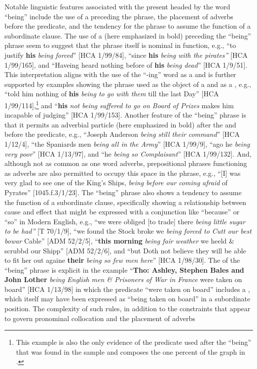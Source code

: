 Notable linguistic features associated with the present  headed by the word “being” include the use of a   preceding the phrase, the placement of adverbs before the predicate, and the tendency for the phrase to assume the function of a subordinate clause. The use of a   (here emphasized in bold) preceding the “being” phrase seem to suggest that the phrase itself is nominal in function, e.g., “to justify \textbf{his} \textit{being forced}” [HCA 1/99/84], “since \textbf{his} \textit{being with the pirates”} [HCA 1/99/165], and “Haveing heard nothing before of \textbf{his} \textit{being dead}” [HCA 1/9/51]. This interpretation aligns with the use of the “-ing” word as a  and is further supported by examples showing the phrase used as the object of a  and as a , e.g., “told him nothing of \textbf{his} \textit{being to go with them} till the last Day” [HCA 1/99/114],\footnote{This example is also the only evidence of the  predicate used after the  “being” that was found in the sample and composes the one percent of the graph in .}  and “\textbf{his} \textit{not being suffered to go on Board of Prizes} makes him incapable of judging” [HCA 1/99/153].  Another feature of the “being” phrase is that it permits an adverbial particle (here emphasized in bold) after the  and before the predicate, e.g., “Joseph Anderson \textit{being \textit{still} their} \textit{command}” [HCA 1/12/4], “the Spaniards men \textit{being \textit{all} in} \textit{the Army}” [HCA 1/99/9], “ago he \textit{being \textit{very} poor}” [HCA 1/13/97], and “he \textit{being \textit{so} Complaisant}” [HCA 1/99/132]. And, although not as common as one word adverbs, prepositional phrases functioning as adverbs are also permitted to occupy this space in the phrase, e.g., “[I] was very glad to see one of the King’s Ships, \textit{being \textit{before our coming} afraid} of Pyrates” [1045.f.3/1/23]. The “being” phrase also shows a tendency to assume the function of a subordinate clause, specifically showing a relationship between cause and effect that might be expressed with a conjunction like “because” or “so” in Modern English, e.g., “we were obliged [to trade] there \textit{being little sugar to be had”} [T 70/1/9], “we found the Stock broke we \textit{being forced to Cutt our best bowar} Cable” [ADM 52/2/5], “\textbf{this morning} \textit{being fair weather} we heeld \& scrubbd our Shipp” [ADM 52/2/6], and “but Doth not believe they will be able to fit her out againe \textbf{their} \textit{being so few men here}” [HCA 1/98/30]. The  of the “being” phrase is explicit in the example “\textbf{Tho: Ashley, Stephen Bales and John Lother} \textit{being English men \& Prisoners of War in France} were taken on board” [HCA 1/13/98] in which the  predicate “were taken on board” includes a , which itself may have been expressed as “being taken on board” in a subordinate position. The complexity of such  rules, in addition to the constraints that appear to govern  pronominal collocation and the placement of adverbs 